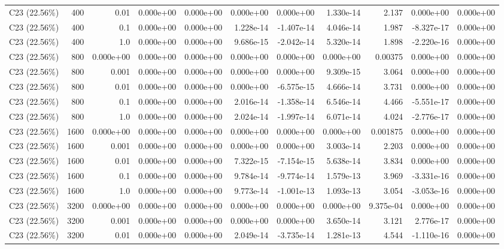 \begin{table}[!htb]
{\begin{tabular}{@{}lrrrrrrrrrr@{}}
C23 (22.56\%) & 400 & 0.01 & 0.000e+00 & 0.000e+00 & 0.000e+00 & 0.000e+00 & 1.330e-14 & 2.137 & 0.000e+00 & 0.000e+00 \\
C23 (22.56\%) & 400 & 0.1 & 0.000e+00 & 0.000e+00 & 1.228e-14 & -1.407e-14 & 4.046e-14 & 1.987 & -8.327e-17 & 0.000e+00 \\
C23 (22.56\%) & 400 & 1.0 & 0.000e+00 & 0.000e+00 & 9.686e-15 & -2.042e-14 & 5.320e-14 & 1.898 & -2.220e-16 & 0.000e+00 \\
C23 (22.56\%) & 800 & 0.000e+00 & 0.000e+00 & 0.000e+00 & 0.000e+00 & 0.000e+00 & 0.000e+00 & 0.00375 & 0.000e+00 & 0.000e+00 \\
C23 (22.56\%) & 800 & 0.001 & 0.000e+00 & 0.000e+00 & 0.000e+00 & 0.000e+00 & 9.309e-15 & 3.064 & 0.000e+00 & 0.000e+00 \\
C23 (22.56\%) & 800 & 0.01 & 0.000e+00 & 0.000e+00 & 0.000e+00 & -6.575e-15 & 4.666e-14 & 3.731 & 0.000e+00 & 0.000e+00 \\
C23 (22.56\%) & 800 & 0.1 & 0.000e+00 & 0.000e+00 & 2.016e-14 & -1.358e-14 & 6.546e-14 & 4.466 & -5.551e-17 & 0.000e+00 \\
C23 (22.56\%) & 800 & 1.0 & 0.000e+00 & 0.000e+00 & 2.024e-14 & -1.997e-14 & 6.071e-14 & 4.024 & -2.776e-17 & 0.000e+00 \\
C23 (22.56\%) & 1600 & 0.000e+00 & 0.000e+00 & 0.000e+00 & 0.000e+00 & 0.000e+00 & 0.000e+00 & 0.001875 & 0.000e+00 & 0.000e+00 \\
C23 (22.56\%) & 1600 & 0.001 & 0.000e+00 & 0.000e+00 & 0.000e+00 & 0.000e+00 & 3.003e-14 & 2.203 & 0.000e+00 & 0.000e+00 \\
C23 (22.56\%) & 1600 & 0.01 & 0.000e+00 & 0.000e+00 & 7.322e-15 & -7.154e-15 & 5.638e-14 & 3.834 & 0.000e+00 & 0.000e+00 \\
C23 (22.56\%) & 1600 & 0.1 & 0.000e+00 & 0.000e+00 & 9.784e-14 & -9.774e-14 & 1.579e-13 & 3.969 & -3.331e-16 & 0.000e+00 \\
C23 (22.56\%) & 1600 & 1.0 & 0.000e+00 & 0.000e+00 & 9.773e-14 & -1.001e-13 & 1.093e-13 & 3.054 & -3.053e-16 & 0.000e+00 \\
C23 (22.56\%) & 3200 & 0.000e+00 & 0.000e+00 & 0.000e+00 & 0.000e+00 & 0.000e+00 & 0.000e+00 & 9.375e-04 & 0.000e+00 & 0.000e+00 \\
C23 (22.56\%) & 3200 & 0.001 & 0.000e+00 & 0.000e+00 & 0.000e+00 & 0.000e+00 & 3.650e-14 & 3.121 & 2.776e-17 & 0.000e+00 \\
C23 (22.56\%) & 3200 & 0.01 & 0.000e+00 & 0.000e+00 & 2.049e-14 & -3.735e-14 & 1.281e-13 & 4.544 & -1.110e-16 & 0.000e+00 \\

\end{tabular}}
\end{table}
